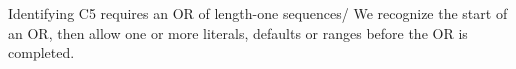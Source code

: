 Identifying C5 requires an OR of length-one sequences/ 
We recognize the start of an OR, then allow one or more literals, defaults or ranges before the OR is completed.




